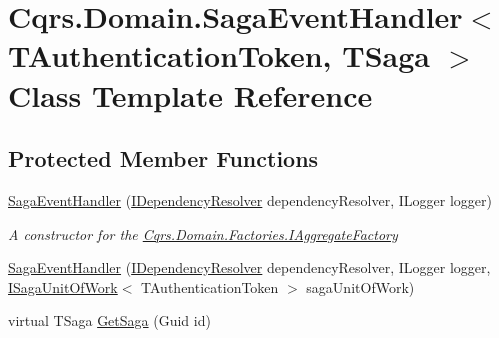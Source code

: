 \hypertarget{classCqrs_1_1Domain_1_1SagaEventHandler}{}\section{Cqrs.\+Domain.\+Saga\+Event\+Handler$<$ T\+Authentication\+Token, T\+Saga $>$ Class Template Reference}
\label{classCqrs_1_1Domain_1_1SagaEventHandler}
\subsection*{Protected Member Functions}
\begin{DoxyCompactItemize}
\item 
\hyperlink{classCqrs_1_1Domain_1_1SagaEventHandler_a4ad68643dd845330a96c71039cf0897f_a4ad68643dd845330a96c71039cf0897f}{Saga\+Event\+Handler} (\hyperlink{interfaceCqrs_1_1Configuration_1_1IDependencyResolver}{I\+Dependency\+Resolver} dependency\+Resolver, I\+Logger logger)
\begin{DoxyCompactList}\small\item\em A constructor for the \hyperlink{interfaceCqrs_1_1Domain_1_1Factories_1_1IAggregateFactory}{Cqrs.\+Domain.\+Factories.\+I\+Aggregate\+Factory} \end{DoxyCompactList}\item 
\hyperlink{classCqrs_1_1Domain_1_1SagaEventHandler_a061ebe3676b158d952b26629195df627_a061ebe3676b158d952b26629195df627}{Saga\+Event\+Handler} (\hyperlink{interfaceCqrs_1_1Configuration_1_1IDependencyResolver}{I\+Dependency\+Resolver} dependency\+Resolver, I\+Logger logger, \hyperlink{interfaceCqrs_1_1Domain_1_1ISagaUnitOfWork}{I\+Saga\+Unit\+Of\+Work}$<$ T\+Authentication\+Token $>$ saga\+Unit\+Of\+Work)
\item 
virtual T\+Saga \hyperlink{classCqrs_1_1Domain_1_1SagaEventHandler_ad3ef0b5067004d4930c45a6585f54764_ad3ef0b5067004d4930c45a6585f54764}{Get\+Saga} (Guid id)
\end{DoxyCompactItemize}

